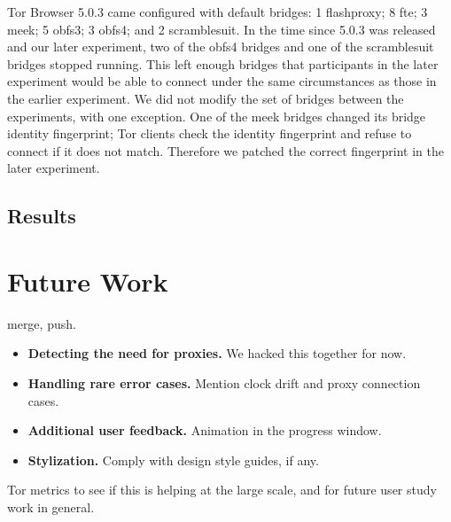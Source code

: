 \documentclass{template}
\begin{document}
Tor Browser 5.0.3 came configured with default bridges:
1 flashproxy;
8 fte;
3 meek;
5 obfs3;
3 obfs4;
and 2 scramblesuit.
In the time since 5.0.3 was released and our later experiment,
two of the obfs4 bridges and one of the scramblesuit bridges stopped running.
This left enough bridges that participants in the later experiment would be able to connect
under the same circumstances as those in the earlier experiment.
We did not modify the set of bridges between the experiments,
with one exception.
One of the meek bridges changed its bridge identity fingerprint;
Tor clients check the identity fingerprint and refuse to connect
if it does not match.
Therefore we patched the correct fingerprint in the later experiment.

\subsection{Results} 

\section{Future Work} 
{\color {red}
 merge, push. 

\begin{itemize} \itemsep1pt \parskip0pt  
\item {\bfseries Detecting the need for proxies.} We hacked this together for now. 
\item {\bfseries Handling rare error cases.} Mention clock drift and proxy connection cases.
\item {\bfseries Additional user feedback.} Animation in the progress window. 
\item {\bfseries Stylization.} Comply with design style guides, if any. 
\end{itemize} 

 Tor metrics to see if this is helping at the large scale, and for future user study work in general. 
}
\end{document}
